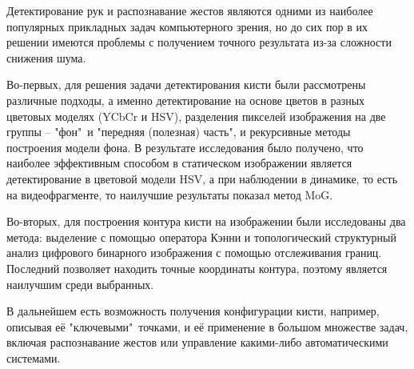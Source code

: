 
Детектирование рук и распознавание жестов являются одними из
наиболее популярных прикладных задач компьютерного зрения, но
до сих пор в их решении имеются проблемы с получением точного
результата из-за сложности снижения шума. 

Во-первых, для решения задачи детектирования кисти
были рассмотрены различные подходы, а именно детектирование
на основе цветов в разных цветовых моделях (YCbCr и HSV),
разделения пикселей изображения на две группы -- "фон"\ и
"передняя (полезная) часть", и рекурсивные методы
построения модели фона. В результате исследования было получено,
что наиболее эффективным способом в статическом изображении
является детектирование в цветовой модели HSV, а при 
наблюдении в динамике, то есть на видеофрагменте, то 
наилучшие результаты показал метод MoG. 

Во-вторых, для построения контура кисти на изображении были
исследованы два метода: выделение с помощью оператора Кэнни и 
топологический структурный анализ цифрового бинарного
изображения с помощью отслеживания границ. Последний позволяет
находить точные координаты контура, поэтому является наилучшим
среди выбранных.

В дальнейшем есть возможность получения конфигурации
кисти, например, описывая её "ключевыми"\ точками, 
и её применение в большом множестве задач, включая
распознавание жестов или управление какими-либо автоматическими
системами.

